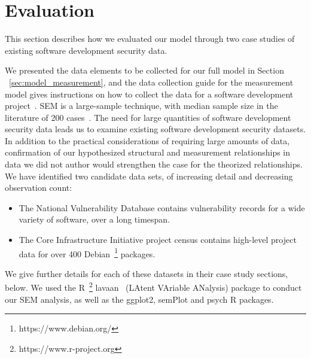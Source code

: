 \section{Evaluation}
\label{sec:evaluation}

This section describes how we evaluated our model through two case studies of existing software development security data.

We presented the data elements to be collected for our full model in Section ~\ref{sec:model_measurement}, and the data collection guide for the measurement model gives instructions on how to collect the data for a software development project~\cite{morrison2016spefsite}.  SEM is a large-sample technique, with median sample size in the literature of 200 cases~\cite{kline2015principles}. The need for large quantities of software development security data leads us to examine existing software development security datasets. In addition to the practical considerations of requiring large amounts of data, confirmation of our hypothesized structural and measurement relationships in data we did not author would strengthen the case for the theorized relationships.
We have identified two candidate data sets, of increasing detail and decreasing observation count: 
\begin{itemize}
\item The National Vulnerability Database contains vulnerability records for a wide variety of software, over a long timespan.
\item The Core Infrastructure Initiative project census contains high-level project data for over 400 Debian~\footnote{https://www.debian.org/} packages.
\end{itemize}

We give further details for each of these datasets in their case study sections, below. We used the R~\footnote{https://www.r-project.org}  lavaan~\cite{roseel2012lavaan} (LAtent VAriable ANalysis) package to conduct our SEM analysis, as well as the ggplot2, semPlot and psych R packages.